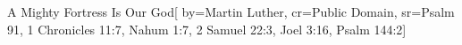 {A Mighty Fortress Is Our God}[
    by={Martin Luther},
    cr={Public Domain},
    sr={Psalm 91, 1 Chronicles 11:7, Nahum 1:7, 2 Samuel 22:3, Joel 3:16, Psalm 144:2}]

